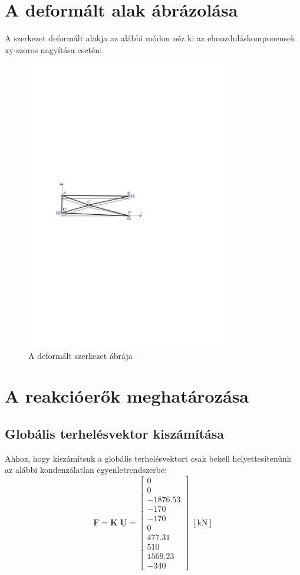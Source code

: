 \documentclass[12pt,a4paper]{article}
\def\mx#1{\mathbf{#1}}
\def\vec#1{\underline{\mathbf{#1}}}
\def\kN{\; \left[\mathrm{kN}\right]}
\begin{document}
\section{A deformált alak ábrázolása}
A szerkezet deformált alakja az alábbi módon néz ki az elmozduláskomponensek xy-szoros
nagyítása esetén:
\begin{figure}[H]
    \centering
    \includegraphics[width=0.8\textwidth]{vszhf1_def.pdf}
    \caption{A deformált szerkezet ábrája}
\end{figure}
\section{A reakcióerők meghatározása}
\subsection{Globális terhelésvektor kiszámítása}
Ahhoz, hogy kiszámítsuk a globális terhelésvektort csak bekell helyettesítenünk
az alábbi kondenzálatlan egyenletrendszerbe:
\begin{equation}
    \vec{F}=\mx{K} \; \vec{U}=
    \begin{bmatrix}
        0        \\
        0        \\
        -1876.53 \\
        -170     \\
        -170     \\
        0        \\
        477.31   \\
        510      \\
        1569.23  \\
        -340
    \end{bmatrix} \kN
\end{equation}
\end{document}
